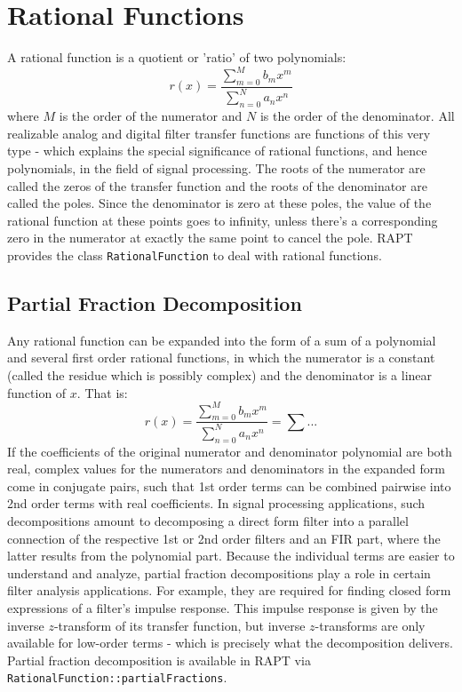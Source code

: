 \section{Rational Functions}
A rational function is a quotient or 'ratio' of two polynomials:
\begin{equation}
	r(x) = \frac{\sum_{m=0}^M b_m x^m} {\sum_{n=0}^N a_n x^n}
\end{equation}
where $M$ is the order of the numerator and $N$ is the order of the denominator. All realizable analog and digital filter transfer functions are functions of this very type - which explains the special significance of rational functions, and hence polynomials, in the field of signal processing. The roots of the numerator are called the zeros of the transfer function and the roots of the denominator are called the poles. Since the denominator is zero at these poles, the value of the rational function at these points goes to infinity, unless there's a corresponding zero in the numerator at exactly the same point to cancel the pole. RAPT provides the class \texttt{RationalFunction} to deal with rational functions.

\subsection{Partial Fraction Decomposition}
Any rational function can be expanded into the form of a sum of a polynomial and several first order rational functions, in which the numerator is a  constant (called the residue which is possibly complex) and the denominator is a linear function of $x$. That is:
\begin{equation}
	r(x) = \frac{\sum_{m=0}^M b_m x^m} {\sum_{n=0}^N a_n x^n}
	     = \sum ...
\end{equation}
If the coefficients of the original numerator and denominator polynomial are both real, complex values for the numerators and denominators in the expanded form come in conjugate pairs, such that 1st order terms can be combined pairwise into 2nd order terms with real coefficients. In signal processing applications, such decompositions amount to decomposing a direct form filter into a parallel connection of the respective 1st or 2nd order filters and an FIR part, where the latter results from the polynomial part. Because the individual terms are easier to understand and analyze, partial fraction decompositions play a role in certain filter analysis applications. For example, they are required for finding closed form expressions of a filter's impulse response. This impulse response is given by the inverse $z$-transform of its transfer function, but inverse $z$-transforms are only available for low-order terms - which is precisely what the decomposition delivers. Partial fraction decomposition is available in RAPT via \texttt{RationalFunction::partialFractions}.


